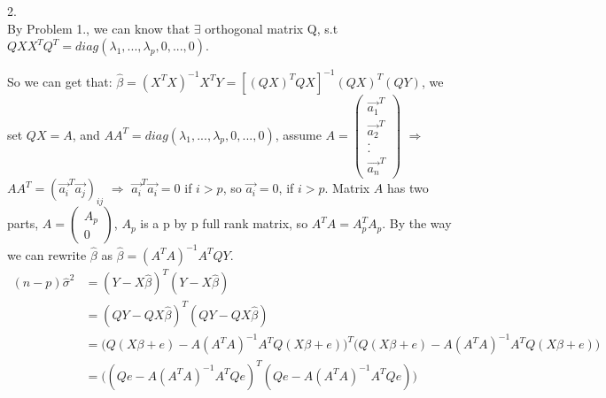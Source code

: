 \documentclass[fleqn]{article}
\begin{document}
 
2.\\

By Problem 1., we can know that $\exists$ orthogonal matrix Q, s.t $QXX^TQ^T = diag(\lambda_1,...,\lambda_p,0,...,0)$.

So we can get that: $\hat{\beta} = (X^TX)^{-1}X^TY = [(QX)^TQX]^{-1}(QX)^T(QY)$, we set $QX = A$, and $AA^T = diag(\lambda_1,...,\lambda_p,0,...,0)$, assume $A = \left(\begin{matrix}
\vec{a_1}^T\\
\vec{a_2}^T\\
.\\
.\\
\vec{a_n}^T
\end{matrix}\right)$ $\Rightarrow$ $AA^T = (\vec{a_i}^T \vec{a_j})_{ij}$ $\Rightarrow$ $\vec{a_i}^T \vec{a_i} = 0$ if $i > p$, so $\vec{a_i} = 0$, if $i > p$. Matrix $A$ has two parts, $A = \left(\begin{matrix}
A_p\\
0
\end{matrix}\right)$, $A_p$ is a p by p full rank matrix, so $A^TA = A_p^T A_p$. By the way we can rewrite $\hat{\beta}$ as $\hat{\beta} = (A^TA)^{-1}A^TQY$.\\

\begin{equation*}
\begin{split}
(n-p) \hat{\sigma}^2 &= (Y-X\hat{\beta})^T (Y-X\hat{\beta})\\
&= (QY - QX\hat{\beta})^T (QY - QX\hat{\beta}) \\
&= \Big(Q(X\beta + e) - A(A^TA)^{-1}A^TQ(X\beta +e)\Big)^T \Big(Q(X\beta + e) - A(A^TA)^{-1}A^TQ(X\beta +e)\Big) \\
&= \Big((Qe - A(A^TA)^{-1}A^TQe)^T (Qe - A(A^TA)^{-1}A^TQe)\Big)
\end{split}
\end{equation*}\\
\end{document}
